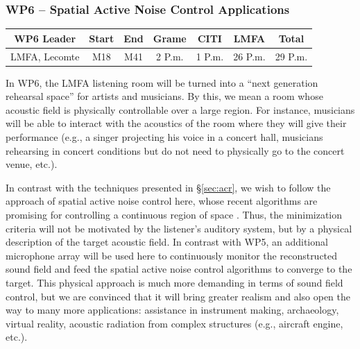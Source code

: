 \documentclass[a4paper,9pt]{extarticle}
\begin{document}
\subsubsection{WP6 -- Spatial Active Noise Control Applications}
\label{subsubsec:wp6}

\begin{center}
\begin{tabular}{c | c c | c c c | c}
\textbf{WP6 Leader} & \textbf{Start} & \textbf{End} & \textbf{Grame} & \textbf{CITI} & \textbf{LMFA} & \textbf{Total}\\
\hline
LMFA, Lecomte & M18 & M41 & 2 P.m. & 1 P.m. & 26 P.m. & 29 P.m.
\end{tabular}
\end{center}

In WP6, the LMFA listening room will be turned into a ``next generation rehearsal space'' for artists and musicians. By this, we mean a room whose acoustic field is physically controllable over a large region. For instance, musicians will be able to interact with the acoustics of the room where they will give their performance (e.g., a singer projecting his voice in a concert hall, musicians rehearsing in concert conditions but do not need to physically go to the concert venue, etc.).

In contrast with the techniques presented in \S\ref{sec:acr}, we wish to follow the approach of spatial active noise control here, whose recent algorithms are promising for controlling a continuous region of space \cite{lecomte2018cancellation,zhang2018active}. Thus, the minimization criteria will not be motivated by the listener's auditory system, but by a physical description of the target acoustic field. In contrast with WP5, an additional microphone array will be used here to continuously monitor the reconstructed sound field and feed the spatial active noise control algorithms to converge to the target. This physical approach is much more demanding in terms of sound field control, but we are convinced that it will bring greater realism and also open the way to many more applications: assistance in instrument making, archaeology, virtual reality, acoustic radiation from complex structures (e.g., aircraft engine, etc.). 
\end{document}
